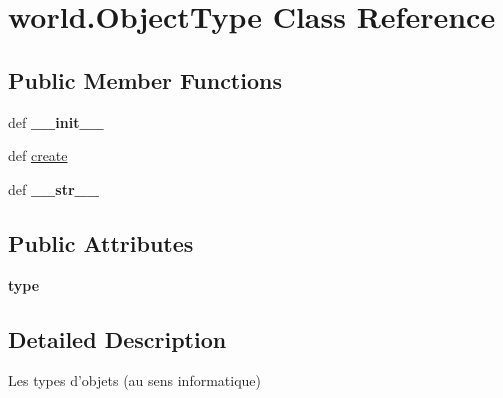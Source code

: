 \hypertarget{classworld_1_1_object_type}{\section{world.\-Object\-Type \-Class \-Reference}
\label{classworld_1_1_object_type}
}
\subsection*{\-Public \-Member \-Functions}
\begin{DoxyCompactItemize}
\item 
\hypertarget{classworld_1_1_object_type_a8e22b69e8867f70d768f1c29b5d67299}{def {\bfseries \-\_\-\-\_\-init\-\_\-\-\_\-}}\label{classworld_1_1_object_type_a8e22b69e8867f70d768f1c29b5d67299}

\item 
def \hyperlink{classworld_1_1_object_type_aec3659e529c2f58cc8ec05a759811015}{create}
\item 
\hypertarget{classworld_1_1_object_type_a338113a75208a1dd1ff1e3a60fcc2dbb}{def {\bfseries \-\_\-\-\_\-str\-\_\-\-\_\-}}\label{classworld_1_1_object_type_a338113a75208a1dd1ff1e3a60fcc2dbb}

\end{DoxyCompactItemize}
\subsection*{\-Public \-Attributes}
\begin{DoxyCompactItemize}
\item 
\hypertarget{classworld_1_1_object_type_ae9880fda72c8950d1b1b070efa72279e}{{\bfseries type}}\label{classworld_1_1_object_type_ae9880fda72c8950d1b1b070efa72279e}

\end{DoxyCompactItemize}


\subsection{\-Detailed \-Description}
\begin{DoxyVerb}Les types d'objets (au sens informatique) \end{DoxyVerb}
 

